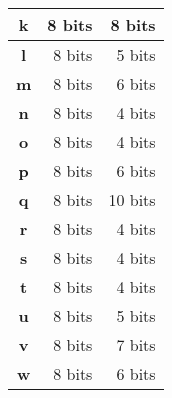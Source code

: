 \documentclass{article}
\begin{document}
\begin{minipage}[t]{.5\textwidth}
\begin{tabular}{|c|r|r|}
            \textbf{k}                              & 8 bits                                        & 8 bits                                               \\ \hline
            \textbf{l}                              & 8 bits                                        & 5 bits                                               \\ \hline
            \textbf{m}                              & 8 bits                                        & 6 bits                                               \\ \hline
            \textbf{n}                              & 8 bits                                        & 4 bits                                               \\ \hline
            \textbf{o}                              & 8 bits                                        & 4 bits                                               \\ \hline
            \textbf{p}                              & 8 bits                                        & 6 bits                                               \\ \hline
            \textbf{q}                              & 8 bits                                        & 10 bits                                              \\ \hline
            \textbf{r}                              & 8 bits                                        & 4 bits                                               \\ \hline
            \textbf{s}                              & 8 bits                                        & 4 bits                                               \\ \hline
            \textbf{t}                              & 8 bits                                        & 4 bits                                               \\ \hline
            \textbf{u}                              & 8 bits                                        & 5 bits                                               \\ \hline
            \textbf{v}                              & 8 bits                                        & 7 bits                                               \\ \hline
            \textbf{w}                              & 8 bits                                        & 6 bits                                               \\ \hline

\end{tabular}
\end{minipage}
\end{document}
